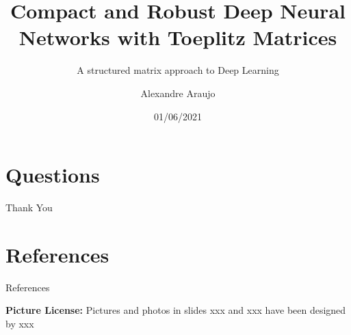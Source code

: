 \documentclass[usenames,dvipsnames,9pt]{beamer}
\title{\normalsize{Compact and Robust Deep Neural Networks with Toeplitz Matrices}}
\subtitle{\normalsize{A structured matrix approach to Deep Learning}}
\date{01/06/2021}
\author{Alexandre Araujo}
\institute{Universit\'e Paris-Dauphine-PSL}
\begin{document}
  \maketitle

  

  \section{Questions}

  \begin{frame}
    \centering
    \Huge Thank You
  \end{frame}


  \section{References}
  \begin{frame}{References}
    
    
    \textbf{Picture License:} Pictures and photos in slides xxx and xxx have been designed by xxx
  \end{frame}
\end{document}
